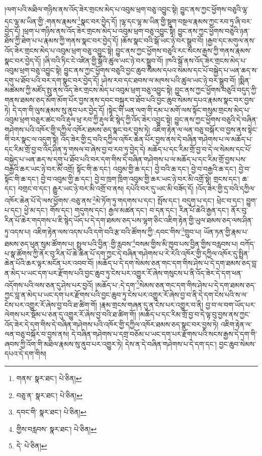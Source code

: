།ལག་པའི་མཐིལ་གཉིས་ནས་འོད་ཟེར་གྲངས་མེད་པ་འབུམ་ཕྲག་བཅུ་འབྱུང་སྟེ། བྱུང་ནས་ཀྱང་ཕྱོགས་བཅུའི་ལྷ་དང་ལྷ་མ་ཡིན་གྱི་:གནས་རྣམས་\footnote{གནས་  སྣར་ཐང་།  པེ་ཅིན། }སྣང་བར་བྱེད་དོ། །ལྷ་དང་ལྷ་མ་ཡིན་གྱི་སྡུག་བསྔལ་རྣམས་ཀྱང་རབ་ཏུ་ཞི་བར་བྱེད་དོ། །ཕྲག་པ་གཉིས་ནས་འོད་ཟེར་གྲངས་མེད་པ་འབུམ་ཕྲག་བཅུ་འབྱུང་སྟེ། བྱུང་ནས་ཀྱང་ཕྱོགས་བཅུའི་ཉན་ཐོས་ཀྱི་ཐེག་པ་པ་རྣམས་ཀྱི་གནས་སྣང་བར་བྱེད་དོ། །ཆོས་སྣང་བའི་སྒོ་ཡང་ཉེ་བར་སྒྲུབ་བོ། །རྒྱབ་དང་མགུལ་ནས་འོད་ཟེར་གྲངས་མེད་པ་འབུམ་ཕྲག་བཅུ་འབྱུང་སྟེ། བྱུང་ནས་ཀྱང་ཕྱོགས་བཅུའི་རང་སངས་རྒྱས་ཀྱི་གནས་རྣམས་སྣང་བར་བྱེད་དོ། །ཞི་བའི་ཏིང་ངེ་འཛིན་གྱི་སྒོའི་ཚུལ་ཡང་ཉེ་བར་སྒྲུབ་བོ། །ཁའི་སྒོ་ནས་འོད་ཟེར་གྲངས་མེད་པ་འབུམ་ཕྲག་བཅུ་འབྱུང་སྟེ། བྱུང་ནས་ཀྱང་ཕྱོགས་བཅུའི་བྱང་ཆུབ་སེམས་དཔའ་སེམས་དང་པོ་བསྐྱེད་པ་ཡན་ཆད་ས་དགུ་པ་ཐོབ་པའི་བར་དག་སྣང་བར་བྱེད་དོ། །ཤེས་རབ་དང་ཐབས་ལ་མཁས་པའི་ཚུལ་ཡང་ཉེ་བར་སྒྲུབ་བོ། །སྨིན་མཚམས་ཀྱི་མཛོད་སྤུ་ནས་འོད་ཟེར་གྲངས་མེད་པ་འབུམ་ཕྲག་བཅུ་འབྱུང་སྟེ། བྱུང་ནས་ཀྱང་ཕྱོགས་བཅུའི་བདུད་ཀྱི་གནས་ཐམས་ཅད་མོག་མོག་པོར་བྱས་ནས་དབང་བསྐུར་བ་ཐོབ་པའི་བྱང་ཆུབ་སེམས་དཔའ་རྣམས་སྣང་བར་བྱས་ཏེ། དེ་དག་གི་ལུས་རྣམས་སུ་ནུབ་པར་བྱེད་དོ། །སྟེང་གི་ཡན་ལག་གི་དམ་པ་མགོ་ལས་སྟོང་གསུམ་གྲངས་མེད་པ་འབུམ་ཕྲག་བཅུར་ཚང་བའི་རྡུལ་ཕྲ་རབ་ཀྱི་རྡུལ་ཇི་སྙེད་ཀྱི་འོད་ཟེར་འབྱུང་སྟེ། བྱུང་ནས་ཀྱང་ཕྱོགས་བཅུའི་དེ་བཞིན་གཤེགས་པའི་འཁོར་གྱི་དཀྱིལ་འཁོར་ཐམས་ཅད་སྣང་བར་བྱས་ཏེ། འཇིག་རྟེན་ལ་ལན་བཅུ་བསྐོར་བ་བྱས་ནས་སྟེང་གི་བར་སྣང་ལ་འདུག་སྟེ། འོད་ཟེར་གྱི་དྲ་བའི་དཀྱིལ་འཁོར་ཆེན་པོར་བྱས་ནས་དེ་བཞིན་གཤེགས་པ་ལ་མཆོད་པ་དང་རིམ་གྲོ་བྱ་བ་འོད་ཤིན་ཏུ་གསལ་བ་ཞེས་བྱ་བ་རབ་ཏུ་བྱེད་དེ། མཆོད་པ་དང་རིམ་གྲོ་བྱ་བ་དེ་ལ་སེམས་དང་པོ་བསྐྱེད་པ་ཡན་ཆད་ས་དགུ་པ་ཐོབ་པའི་བར་དག་གིས་དེ་བཞིན་གཤེགས་པ་ལ་མཆོད་པ་དང་རིམ་གྲོ་བྱས་པས་བརྒྱའི་ཆར་ཡང་ཉེ་བར་མི་འགྲོ། སྟོང་གི་ཆ་དང་། འབུམ་གྱི་ཆ་དང་། བྱེ་བའི་ཆ་དང་། བྱེ་བ་བརྒྱའི་ཆ་དང་། བྱེ་བ་སྟོང་གི་ཆ་དང་། བྱེ་བ་འབུམ་གྱི་ཆ་དང་། བྱེ་བ་ཁྲག་ཁྲིག་འབུམ་གྱི་ཆར་ཡང་ཉེ་བར་མི་འགྲོ་སྟེ། གྲངས་དང་། ཆ་དང་། བགྲང་བ་དང་། རྒྱུར་ཡང་ཉེ་བར་མི་འགྲོ་བ་ནས། དཔེའི་བར་དུ་ཡང་མི་བཟོད་དོ། །འོད་ཟེར་གྱི་དྲ་བའི་དཀྱིལ་འཁོར་ཆེན་པོ་དེ་ལས་ཕྱོགས་:བཅུ་ནས་\footnote{བཅུ་ན་  སྣར་ཐང་།  པེ་ཅིན། }མེ་ཏོག་ཏུ་གདགས་པ་དང་། སྤོས་དང་། བདུག་པ་དང་། ཕྲེང་བ་དང་། བྱུག་པ་དང་། ཕྱེ་མ་དང་། གོས་དང་། གདུགས་དང་། རྒྱལ་མཚན་དང་། བ་དན་དང་། རིན་པོ་ཆེའི་རྒྱན་དང་། ནོར་བུ་རིན་པོ་ཆེར་གདགས་པ་ཇི་སྙེད་ཡོད་པ་དེ་དག་ཐམས་ཅད་པས་ལྷག་ཅིང་འཇིག་རྟེན་གྱི་ཡུལ་ཐམས་ཅད་ལས་ཤིན་ཏུ་འདས་པ། འཇིག་རྟེན་ལས་འདས་པའི་དགེ་བའི་རྩ་བའི་ཚོགས་ཀྱི་:དབང་གིས་\footnote{དབང་གི་  སྣར་ཐང་།  པེ་ཅིན། }གྲུབ་པ། ཡོན་ཏན་གྱི་རྣམ་པ་ཐམས་ཅད་ཕུན་སུམ་ཚོགས་པ། སྤྲུལ་པའི་བྱིན་:གྱི་རླབས་\footnote{གྱིས་བརླབས་  སྣར་ཐང་།  པེ་ཅིན། }བསམ་གྱིས་མི་ཁྱབ་པས་བྱིན་གྱིས་བརླབས་པ། བཀོད་པ་སྣ་ཚོགས་ཀྱི་ནོར་བུ་རིན་པོ་ཆེ་ཆེན་པོ་དག་ཀྱང་དེ་བཞིན་གཤེགས་པ་རེ་རེའི་འཁོར་གྱི་དཀྱིལ་འཁོར་དུ་སྤྲིན་ཆེན་པོའི་ཆར་ལྟར་མངོན་པར་འབབ་བོ། །མཆོད་པ་དེ་དག་སེམས་ཅན་གང་དག་གིས་ཤེས་པ་དེ་དག་ཐམས་ཅད་བླ་ན་མེད་པ་ཡང་དག་པར་རྫོགས་པའི་བྱང་ཆུབ་ཏུ་ངེས་པར་འགྱུར་རོ་ཞེས་གསུངས་པ་ནི་འོད་ཟེར་དེ་དག་ཕན་འདོགས་པའི་ལས་ཅན་དུ་ཤེས་པར་བྱའོ། །མཆོད་པ་:དེ་དག་\footnote{དེ་  པེ་ཅིན། }སེམས་ཅན་གང་དག་གིས་ཤེས་པ་དེ་དག་ཐམས་ཅད་ཀྱང་བླ་ན་མེད་པ་ཡང་དག་པར་རྫོགས་པའི་བྱང་ཆུབ་ཏུ་ངེས་པར་འགྱུར་རོ་ཞེས་བྱ་བ་ནི་དེ་དག་ངེས་པའི་ས་ལ་ངེས་པར་འགྱུར་རོ་ཞེས་བྱ་བའི་ཐ་ཚིག་གོ། །རྣམ་གྲངས་གཞན་དུ་ན་ངེས་པར་འགྱུར་བ་ནི། བྱ་བ་ལ་བག་ཡོད་པར་ལེགས་པར་སྡོམ་པ་ཅན་དུ་འགྱུར་རོ་ཞེས་བྱ་བའི་ཐ་ཚིག་གོ། །མཆོད་པ་དང་རིམ་གྲོ་བྱ་བ་དེ་ལྟ་བུ་བྱས་ནས་ཀྱང་འོད་ཟེར་དེ་དག་གིས་དེ་བཞིན་གཤེགས་པའི་འཁོར་གྱི་དཀྱིལ་འཁོར་ཐམས་ཅད་སྣང་བར་བྱས་ཏེ། འཇིག་རྟེན་ལ་ལན་བཅུ་བསྐོར་བ་བྱས་ནས། དེ་བཞིན་གཤེགས་པ་དགྲ་བཅོམ་པ་ཡང་དག་པར་རྫོགས་པའི་སངས་རྒྱས་དེ་དག་གི་ཞབས་ཀྱི་འོག་གི་མཐིལ་རྣམས་སུ་ནུབ་པར་འགྱུར་ཏེ། དེས་ན་དེ་བཞིན་གཤེགས་པ་དེ་དག་དང་། བྱང་ཆུབ་སེམས་དཔའ་དེ་དག་གིས། 